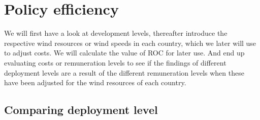 \documentclass[a4paper, 12pt]{article}
\begin{document}
\section{Policy efficiency}
We will first have a look at development levels, thereafter introduce the respective wind resources or wind speeds in each country, which we later will use to adjust costs. We will calculate the value of ROC for later use. And end up evaluating costs or remuneration levels to see if the findings of different deployment levels are a result of the different remuneration levels when these have been adjusted for the wind resources of each country.

\subsection{Comparing deployment level}
\end{document}
